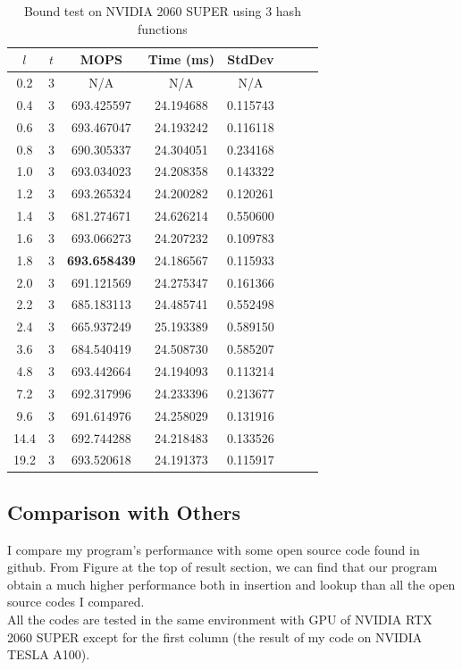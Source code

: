 \documentclass[10pt,twocolumn,letterpaper]{article}
\begin{document}
\begin{table}[!h]
    \centering
   \begin{tabular}{@{}c|ccccccc@{}}
\toprule
$l$ & $t$ & MOPS    & Time (ms)& StdDev  \\ \midrule
0.2 & 3 & N/A & N/A & N/A \\
0.4 & 3 & 693.425597 & 24.194688 & 0.115743 \\
0.6 & 3 & 693.467047 & 24.193242 & 0.116118 \\
0.8 & 3 & 690.305337 & 24.304051 & 0.234168 \\
1.0 & 3 & 693.034023 & 24.208358 & 0.143322 \\
1.2 & 3 & 693.265324 & 24.200282 & 0.120261 \\
1.4 & 3 & 681.274671 & 24.626214 & 0.550600 \\
1.6 & 3 & 693.066273 & 24.207232 & 0.109783 \\
1.8 & 3 & \textbf{693.658439} & 24.186567 & 0.115933 \\
2.0 & 3 & 691.121569 & 24.275347 & 0.161366 \\
2.2 & 3 & 685.183113 & 24.485741 & 0.552498 \\
2.4 & 3 & 665.937249 & 25.193389 & 0.589150 \\
3.6 & 3 & 684.540419 & 24.508730 & 0.585207 \\
4.8 & 3 & 693.442664 & 24.194093 & 0.113214 \\
7.2 & 3 & 692.317996 & 24.233396 & 0.213677 \\
9.6 & 3 & 691.614976 & 24.258029 & 0.131916 \\
14.4 & 3 & 692.744288 & 24.218483 & 0.133526 \\
19.2 & 3 & 693.520618 & 24.191373 & 0.115917 \\
\bottomrule
\end{tabular}
    \caption{Bound test on NVIDIA 2060 SUPER using $3$ hash functions}
    \label{tab:bound_3_2060}
\end{table}

\subsection{Comparison with Others}

I compare my program's performance with some open source code found in github. From Figure at the top of result section, we can find that our program obtain a much higher performance both in insertion and lookup than all the open source codes I compared.\\
All the codes are tested in the same environment with GPU of NVIDIA RTX 2060 SUPER except for the first column (the result of my code on NVIDIA TESLA A100). 
\end{document}
